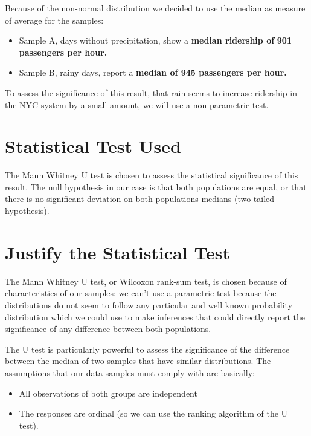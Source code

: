 \documentclass[a4paper,12pt,english]{sphinxmanual}
\begin{document}
Because of the non-normal distribution we decided to use the median as measure
of average for the samples:
\begin{itemize}
\item {} 
Sample A, days without precipitation, show a \textbf{median ridership of}
\textbf{901 passengers per hour.}

\item {} 
Sample B, rainy days, report a \textbf{median of 945 passengers per hour.}

\end{itemize}

To assess the significance of this result, that rain seems to increase ridership
in the NYC system by a small amount, we will use a non-parametric test.


\section{Statistical Test Used}
\label{section1:statistical-test-used}
The Mann Whitney U test is chosen to assess the statistical significance of this
result. The null hypothesis in our case is that both populations are equal, or
that there is no significant deviation on both populations medians (two-tailed
hypothesis).


\section{Justify the Statistical Test}
\label{section1:justify-the-statistical-test}
The Mann Whitney U test, or Wilcoxon rank-sum test, is chosen because of
characteristics of our samples: we can't use a parametric test because the
distributions do not seem to follow any particular and well known probability
distribution which we could use to make inferences that could directly report the
significance of any difference between both populations.

The U test is particularly powerful to assess the significance of the difference
between the median of two samples that have similar distributions. The assumptions
that our data samples must comply with are basically:
\begin{itemize}
\item {} 
All observations of both groups are independent

\item {} 
The responses are ordinal (so we can use the ranking algorithm of the U test).

\end{itemize}
\end{document}
